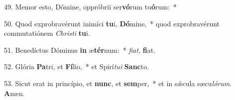 49. Memor esto, Dómine, oppróbrii ser\textbf{vó}rum tu\textbf{ó}rum:~*  \

50. Quod exprobravérunt inimíci \textbf{tu}i, \textbf{Dó}mine,~*  quod exprobravérunt commutatiónem \textit{Chris}\textit{ti} \textbf{tu}i.\

51. Benedíctus Dóminus \textbf{in} æ\textbf{tér}num:~*  \textit{fi}\textit{at}, \textbf{fi}at.\

52. Glória \textbf{Pa}tri, et \textbf{Fí}lio,~*  et Spirí\textit{tu}\textit{i} \textbf{Sanc}to.\

53. Sicut erat in princípio, et \textbf{nunc}, et \textbf{sem}per,~*  et in sǽcula sæcu\textit{ló}\textit{rum}. \textbf{A}men.\

